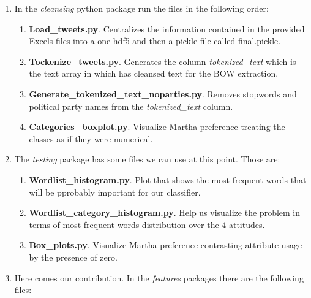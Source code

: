 \documentclass[author-year, review]{elsarticle} %
\begin{document}
\begin{enumerate}
\def\labelenumi{\arabic{enumi}.}
\item
  In the \emph{cleansing} python package run the files in the following
  order:

  \begin{enumerate}
  \def\labelenumii{\alph{enumii}.}
  \item
    \textbf{Load\_tweets.py}. Centralizes the information contained in
    the provided Excels files into a one hdf5 and then a pickle file
    called final.pickle.
  \item
    \textbf{Tockenize\_tweets.py}. Generates the column
    \emph{tokenized\_text} which is the text array in which has cleansed
    text for the BOW extraction.
  \item
    \textbf{Generate\_tokenized\_text\_noparties.py}. Removes stopwords
    and political party names from the \emph{tokenized\_text} column.
  \item
    \textbf{Categories\_boxplot.py}. Visualize Martha preference
    treating the classes as if they were numerical.
  \end{enumerate}
\item
  The \emph{testing} package has some files we can use at this point.
  Those are:

  \begin{enumerate}
  \def\labelenumii{\alph{enumii}.}
  \item
    \textbf{Wordlist\_histogram.py}. Plot that shows the most frequent
    words that will be pprobably important for our classifier.
  \item
    \textbf{Wordlist\_category\_histogram.py}. Help us visualize the
    problem in terms of most frequent words distribution over the 4
    attitudes.
  \item
    \textbf{Box\_plots.py}. Visualize Martha preference contrasting
    attribute usage by the presence of zero.
  \end{enumerate}
\item
  Here comes our contribution. In the \emph{features} packages there are
  the following files:


\end{enumerate}
\end{document}
